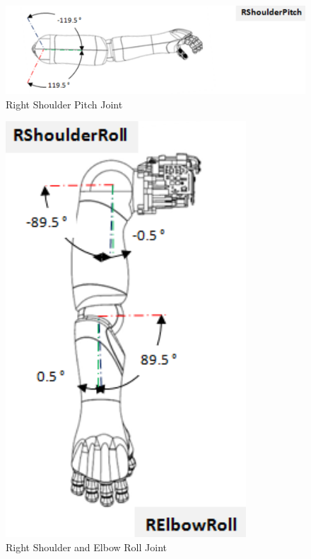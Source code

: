 \documentclass{CSSRforAfrica}
\begin{document}
\begin{figure}[!hbpt]
\centering
\includegraphics[scale=0.35]{images/RShoulderPitch.png}
\caption{Right Shoulder Pitch Joint \cite{PepperJoints}}
\label{fig: Right Shoulder Pitch joint}
\end{figure}

\newpage

\begin{figure}[!hbpt]
    \centering
    \begin{minipage}{0.45\textwidth}
        \centering
        \includegraphics[scale=0.45]{images/RShoulderandElbowRoll.png}
        \caption{Right Shoulder and Elbow Roll Joint \cite{PepperJoints}}
        \label{fig: Right Shoulder and Elbow Roll joint}
    \end{minipage}\hfill

\end{figure}
\end{document}
